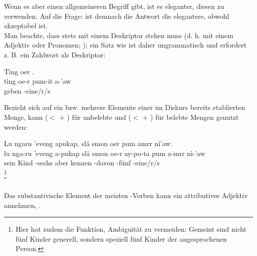 \noindent Wenn es aber einen allgemeineren Begriff gibt, ist es eleganter, diesen zu verwenden. Auf die Frage:   ist demnach die Antwort   die elegantere, obwohl  akzeptabel ist.\\
\indent Man beachte, dass  stets mit einem Deskriptor stehen muss (d. h. mit einem Adjektiv oder Pronomen; ); ein Satz wie  ist daher ungrammatisch und erfordert z. B. ein Zahlwort als Deskriptor:

\begin{interlin}
	\glll \Npawl{}Tìng oer  . \\
	tìng oe-r pum-it a-'aw \\
	geben   -eine/r/s \\
\end{interlin}

\noindent Bezieht sich  auf ein bzw. mehrere Elemente einer im Diskurs bereits etablierten Menge, kann  ($<$  $+$ ) für unbelebte und  ($<$  $+$ ) für belebte Mengen genutzt werden: 

\begin{interlin}
	\glll \Npawl{}Lu ngaru 'eveng apukap, slä smon oer  pum amrr nì'aw. \\
	lu nga-ru 'eveng a-pukap slä smon oe-r ay-po-ta pum a-mrr nì-'aw \\
	sein  Kind -sechs aber kennen  -davon  -fünf -eine/r/s \\
	\footnote{Hier hat  zudem die Funktion, Ambiguität zu vermeiden: Gemeint sind nicht fünf Kinder generell, sondern speziell fünf Kinder der angesprochenen Person.}
\end{interlin}
\label{syn:pum:adj} 

\subsubsection{} Das substantivische Element der meisten -Verben kann ein attributives Adjektiv annehmen,  .

